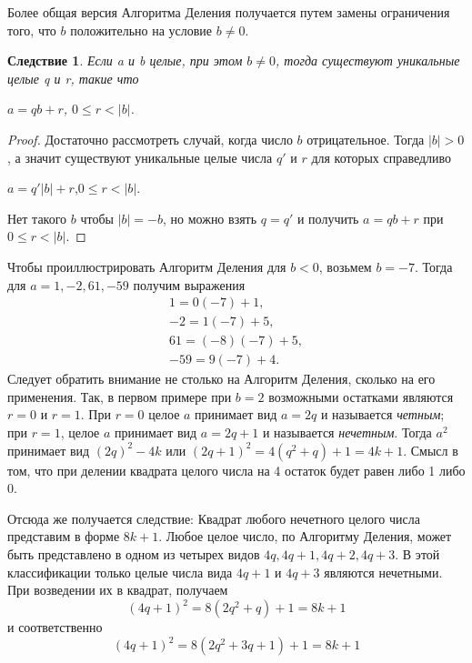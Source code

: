 \documentclass[11pt]{article}
\newtheorem{corollary}{Следствие}
\begin{document}
\qquad \quad \leftskip=-0.9cm \rightskip=-0.9cm Более общая версия Алгоритма Деления получается путем замены ограничения того, что $b$ положительно на условие $b\neq 0$.

\begin{corollary}
Если a и b целые, при этом $b\neq 0$, тогда существуют уникальные целые q и r, такие что
\begin{flushright}
	$a=qb+r$, \qquad \qquad \qquad \qquad \quad $0\leq r<|b|$.
\end{flushright}
\end{corollary}

\begin{proof}
Достаточно рассмотреть случай, когда число $b$ отрицательное. Тогда $|b|>0$, а значит существуют уникальные целые числа $q'$ и $r$ для которых справедливо
\begin{flushright}
	$a=q'|b|+r$,\qquad \qquad \qquad \qquad \quad $0\leq r<|b|$.
\end{flushright}
Нет такого $b$ чтобы $|b|=-b$, но можно взять $q=q'$ и получить $a=qb+r$ при $0\leq r<|b|$.
\end{proof}
\qquad \quad \leftskip=-0.9cm \rightskip=-0.9cm \thispagestyle{3} Чтобы проиллюстрировать Алгоритм Деления для $b<0$, возьмем $b=-7$. Тогда для $a=1,-2,61,-59$ получим выражения
\begin{align*}
	1=0(-7)+1,\\
	-2=1(-7)+5,\\
	61=(-8)(-7)+5,\\
	-59=9(-7)+4.
\end{align*}
Следует обратить внимание не столько на Алгоритм Деления, сколько на его применения. Так, в первом примере при $b=2$ возможными остатками являются $r=0$ и $r=1$. При $r=0$ целое $a$ принимает вид $a=2q$ и называется \textit{четным}; при $r=1$, целое $a$ принимает вид $a=2q+1$ и называется \textit{нечетным}. Тогда $a^2$ принимает вид $(2q)^2-4k$ или $(2q+1)^2=4(q^2+q)+1=4k+1$. Смысл в том, что при делении квадрата целого числа на 4 остаток будет равен либо 1 либо 0.

\qquad \quad Отсюда же получается следствие: Квадрат любого нечетного целого числа представим в форме $8k+1$. Любое целое число, по Алгоритму Деления, может быть представлено в одном из четырех видов $4q, 4q+1, 4q+2, 4q+3$. В этой классификации только целые числа вида $4q+1$ и $4q+3$ являются нечетными. При возведении их в квадрат, получаем
\[(4q+1)^2=8(2q^2+q)+1=8k+1\]
и соответственно
\[(4q+1)^2=8(2q^2+3q+1)+1=8k+1\]
\end{document}
